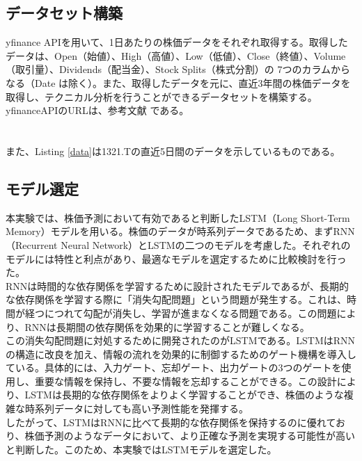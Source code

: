 \documentclass[a4paper, 11pt, titlepage]{jsarticle}
\begin{document}
\subsection{データセット構築}
\indent yfinance APIを用いて、1日あたりの株価データをそれぞれ取得する。取得したデータは、Open（始値）、High（高値）、Low（低値）、Close（終値）、Volume（取引量）、Dividends（配当金）、Stock Splits（株式分割）の 7つのカラムからなる（Date は除く）。また、取得したデータを元に、直近3年間の株価データを取得し、テクニカル分析を行うことができるデータセットを構築する。yfinanceAPIのURLは、参考文献 \cite{yfin}である。\\\\\\
\indent また、Listing \ref{data}は1321.Tの直近5日間のデータを示しているものである。

\subsection{モデル選定}
\indent 本実験では、株価予測において有効であると判断したLSTM（Long Short-Term Memory）モデルを用いる。株価のデータが時系列データであるため、まずRNN（Recurrent Neural Network）とLSTMの二つのモデルを考慮した。それぞれのモデルには特性と利点があり、最適なモデルを選定するために比較検討を行った。\\
\indent RNNは時間的な依存関係を学習するために設計されたモデルであるが、長期的な依存関係を学習する際に「消失勾配問題」という問題が発生する。これは、時間が経つにつれて勾配が消失し、学習が進まなくなる問題である。この問題により、RNNは長期間の依存関係を効果的に学習することが難しくなる。\\
\indent この消失勾配問題に対処するために開発されたのがLSTMである。LSTMはRNNの構造に改良を加え、情報の流れを効果的に制御するためのゲート機構を導入している。具体的には、入力ゲート、忘却ゲート、出力ゲートの3つのゲートを使用し、重要な情報を保持し、不要な情報を忘却することができる。この設計により、LSTMは長期的な依存関係をよりよく学習することができ、株価のような複雑な時系列データに対しても高い予測性能を発揮する。\\
\indent したがって、LSTMはRNNに比べて長期的な依存関係を保持するのに優れており、株価予測のようなデータにおいて、より正確な予測を実現する可能性が高いと判断した。このため、本実験ではLSTMモデルを選定した。
\end{document}
